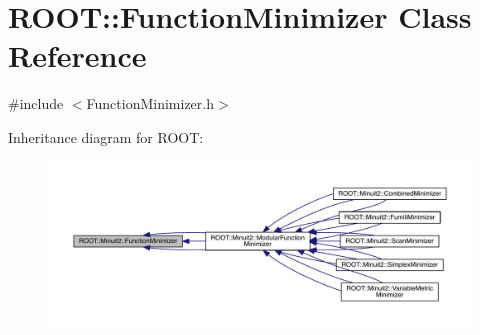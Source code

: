 \hypertarget{classROOT_1_1Minuit2_1_1FunctionMinimizer}{}\section{R\+O\+OT\+:\+:Function\+Minimizer Class Reference}
\label{classROOT_1_1Minuit2_1_1FunctionMinimizer}


{\ttfamily \#include $<$Function\+Minimizer.\+h$>$}



Inheritance diagram for R\+O\+OT\+:
\nopagebreak
\begin{figure}[H]
\begin{center}
\leavevmode
\includegraphics[width=350pt]{d0/d2b/classROOT_1_1Minuit2_1_1FunctionMinimizer__inherit__graph}
\end{center}
\end{figure}
